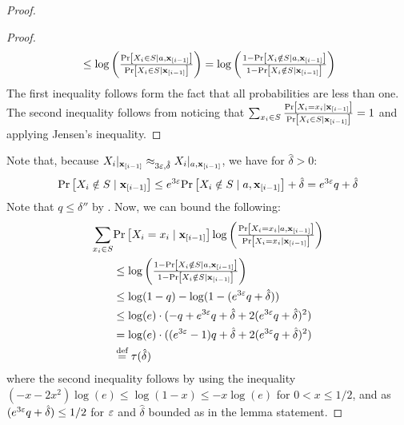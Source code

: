 \begin{proof}
\begin{proof}
\begin{align*}
&\leq \log\left(\tfrac{\mathrm{Pr}\left[X_i \in S \mid a,\mathbf{x}_{[i-1]}\right]}{\mathrm{Pr}\left[X_i \in S\mid \mathbf{x}_{[i-1]}\right]}\right) = \log\left(\tfrac{1 - \mathrm{Pr}\left[X_i \notin S \mid a,\mathbf{x}_{[i-1]}\right]}{1- \mathrm{Pr}\left[X_i \notin S\mid \mathbf{x}_{[i-1]}\right]}\right)\\
\end{align*}
%
The first inequality follows form the fact that all probabilities are less than one. The second inequality follows from noticing that $ \sum_{x_i\in S}\frac{\mathrm{Pr}\left[X_i = x_i\mid \mathbf{x}_{[i-1]}\right]}{\mathrm{Pr}\left[X_i \in S\mid \mathbf{x}_{[i-1]}\right]} = 1$ and applying Jensen's inequality. 
\end{proof}
%
 Note that, because ${X_i|_{\mathbf{x}_{[i-1]}} \approx_{3\varepsilon,\hat{\delta}} X_i|_{a, \mathbf{x}_{[i-1]}}}$, we have for $\hat\delta>0$:
$$
\mathrm{Pr}\left[X_i \notin S\mid \mathbf{x}_{[i-1]}\right] \leq e^{3\varepsilon} \mathrm{Pr}\left[X_i \notin S \mid a,\mathbf{x}_{[i-1]}\right] + \hat\delta = e^{3\varepsilon}q + \hat\delta
$$
%
Note that $q \leq \delta''$ by . Now, we can bound the following:
\begin{align*}
\sum_{x_i \in  S} & \mathrm{Pr}\left[X_i = x_i \mid \mathbf{x}_{[i-1]}\right]  \log\left(\tfrac{\mathrm{Pr}\left[X_i = x_i \mid a,\mathbf{x}_{[i-1]}\right]}{\mathrm{Pr}\left[X_i = x_i \mid \mathbf{x}_{[i-1]}\right]} \right)\\
&\leq \log\left(\tfrac{1 - \mathrm{Pr}\left[X_i \notin S \mid a,\mathbf{x}_{[i-1]}\right]}{1- \mathrm{Pr}\left[X_i \notin S\mid \mathbf{x}_{[i-1]}\right]}\right)\\
&\leq \log(1-q) - \log(1- (e^{3\varepsilon}q + \hat{\delta})  ) \\
& \leq \log(e) \cdot(- q+ e^{3\varepsilon}q + \hat{\delta} + 2(e^{3\varepsilon}q + \hat{\delta})^2)\\
&= \log(e) \cdot ( (e^{3\varepsilon}-1)q + \hat{\delta} + 2(e^{3\varepsilon}q + \hat{\delta})^2 )\\
&\stackrel{\text{def}}{=} \tau(\hat\delta)
\end{align*}
where the second inequality follows by using the inequality $(-x - 2x^2)\log(e) \leq \log(1-x) \leq -x\log(e)$ for $0< x \leq 1/2$, and as $(e^{3\varepsilon}q + \hat{\delta}) \leq 1/2$ for $\varepsilon$ and $\hat\delta$ bounded as in the lemma statement.


\end{proof}
